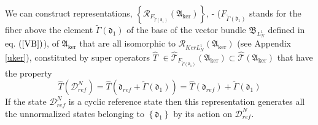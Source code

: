 \documentclass[aps,preprint]{revtex4}%
\begin{document}
We can construct representations, $\left\{  \mathcal{R}_{F_{\tilde{\Gamma
}\left(  \mathfrak{d}_{1}\right)  }}\left(  \mathfrak{A}_{\ker}\right)
\right\}  $, - ($F_{\tilde{\Gamma}\left(  \mathfrak{d}_{1}\right)  }$ stands
for the fiber above the element $\tilde{\Gamma}\left(  \mathfrak{d}%
_{1}\right)  $ of the base of the vector bundle $\mathfrak{B}_{L_{N}^{1}}$
defined in eq. $\left(  \ref{VB}\right)  $), of $\mathfrak{A}_{\ker}$ that are
all isomorphic to $\mathcal{R}_{KerL_{N}^{1}}\left(  \mathfrak{A}_{\ker
}\right)  $ (see Appendix \ref{uker}), constituted by super operators $\hat
{T}$ $\in\mathcal{\hat{T}}_{F_{\tilde{\Gamma}\left(  \mathfrak{d}_{1}\right)
}}\left(  \mathfrak{A}_{\ker}\right)  \subset\mathcal{\hat{T}}\left(
\mathfrak{A}_{\ker}\right)  $ that have the property
\begin{equation}
\hat{T}\left(  \mathcal{D}_{ref}^{N}\right)  =\hat{T}\left(  \mathfrak{d}%
_{ref}+\tilde{\Gamma}\left(  \mathfrak{d}_{1}\right)  \right)  =\hat{T}\left(
\mathfrak{d}_{ref}\right)  +\tilde{\Gamma}\left(  \mathfrak{d}_{1}\right)
\label{SF}%
\end{equation}
If the state $\mathcal{D}_{ref}^{N}$ is a cyclic reference state then this
representation generates all the unnormalized states belonging to $\left\{
\mathfrak{d}_{1}\right\}  $ by its action on $\mathcal{D}_{ref}^{N}$.
\end{document}
